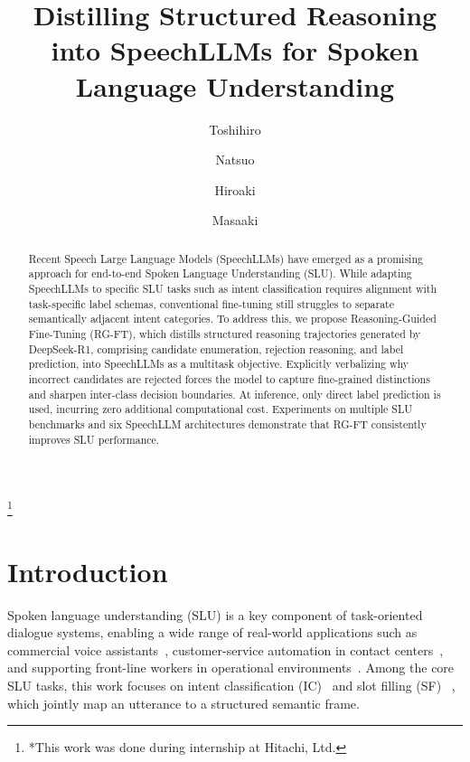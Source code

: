 \documentclass[cameraready]{Interspeech}
\title{Distilling Structured Reasoning into SpeechLLMs for Spoken Language Understanding}
\author[affiliation={1}]{Toshihiro}{Tsukagoshi$^*$}
\author[affiliation={2}]{Natsuo}{Yamashita}
\author[affiliation={2}]{Hiroaki}{Kokubo}
\author[affiliation={2}]{Masaaki}{Yamamoto}
\begin{document}
\maketitle



\begingroup
  \renewcommand\thefootnote{}\footnote{*This work was done during internship at Hitachi, Ltd.}
  \addtocounter{footnote}{-1}
\endgroup


\begin{abstract}
Recent Speech Large Language Models (SpeechLLMs) have emerged as a
promising approach for end-to-end Spoken Language Understanding (SLU).
While adapting SpeechLLMs to specific SLU tasks such as intent
classification requires alignment with task-specific label schemas,
conventional fine-tuning still struggles to separate semantically
adjacent intent categories.
To address this, we propose Reasoning-Guided Fine-Tuning (RG-FT),
which distills structured reasoning trajectories generated by
DeepSeek-R1, comprising candidate enumeration, rejection reasoning,
and label prediction, into SpeechLLMs as a multitask objective.
Explicitly verbalizing why incorrect candidates are rejected forces the
model to capture fine-grained distinctions and sharpen inter-class
decision boundaries.
At inference, only direct label prediction is used, incurring zero
additional computational cost.
Experiments on multiple SLU benchmarks and six SpeechLLM architectures demonstrate that RG-FT consistently improves SLU performance.
\end{abstract}



\section{Introduction}
Spoken language understanding (SLU) is a key component of task-oriented
dialogue systems, enabling a wide range of real-world applications such
as commercial voice
assistants~\cite{SaxonChoudharyMcKennaMouchtaris2021E2ESLUVoiceAssistants},
customer-service automation in contact
centers~\cite{WuMaoFeng2022AIOnlineCustomerService}, and supporting
front-line workers in operational
environments~\cite{LinaresGarcia2022VIVA}.
Among the core SLU tasks, this work focuses on intent classification (IC)~\cite{Atuhurra2024DomainAI} and slot filling (SF)~\cite{weld2022survey} , which jointly map an utterance to a structured semantic frame.
\end{document}
